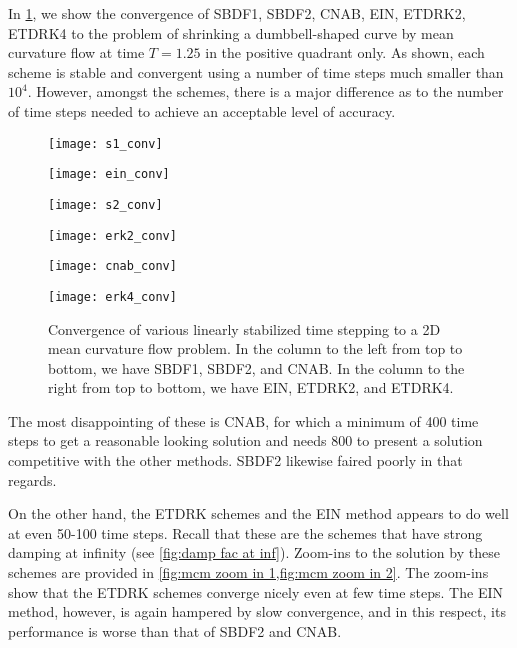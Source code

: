 In \cref{fig:mcm 2d conv}, we show the convergence of SBDF1, SBDF2, CNAB, EIN, ETDRK2, ETDRK4 to the problem of shrinking a dumbbell-shaped curve by mean curvature flow at time $T=1.25$ in the positive quadrant only. As shown, each scheme is stable and convergent  using a number of time steps much smaller than $10^4$. However, amongst the schemes, there is a major difference as to the number of time steps needed to achieve an acceptable level of accuracy. 

\begin{figure}[htb!]
        \centering
\begin{minipage}{0.48\textwidth}
        \texttt{[image: s1\_conv]}
\end{minipage}
\begin{minipage}{0.48\textwidth}
        \texttt{[image: ein\_conv]}
\end{minipage}
\begin{minipage}{0.48\textwidth}
        \texttt{[image: s2\_conv]}
\end{minipage}
\begin{minipage}{0.48\textwidth}
        \texttt{[image: erk2\_conv]}
\end{minipage}
\begin{minipage}{0.48\textwidth}
        \texttt{[image: cnab\_conv]}
\end{minipage}
\begin{minipage}{0.48\textwidth}
        \texttt{[image: erk4\_conv]}
\end{minipage}
\caption[Convergence of linearly stabilized schemes to a shrinking dumbbell problem.]{Convergence of various linearly stabilized time stepping to a 2D mean curvature flow problem. In the column to the left from top to bottom, we have SBDF1, SBDF2, and CNAB. In the column to the right from top to bottom, we have EIN, ETDRK2, and ETDRK4.}
\label{fig:mcm 2d conv}
\end{figure}

The most disappointing of these is CNAB, for which a minimum of 400 time steps to get a reasonable looking solution and needs 800 to present a solution competitive with the other methods. SBDF2 likewise faired poorly in that regards. 

On the other hand, the ETDRK schemes and the EIN method appears to do well at even 50-100 time steps. Recall that these are the schemes that have strong damping at infinity (see \cref{fig:damp fac at inf}). Zoom-ins to the solution by these schemes are provided in \cref{fig:mcm zoom in 1,fig:mcm zoom in 2}. The zoom-ins show that the ETDRK schemes converge nicely even at few time steps. The EIN method, however, is again hampered by slow convergence, and in this respect, its performance is worse than that of SBDF2 and CNAB. 

